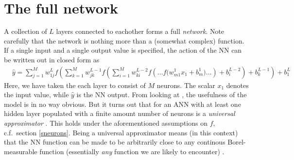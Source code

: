 \documentclass[../../master.tex]{subfiles}
\begin{document}
\begin{SCfigure}
\begin{centering}
\end{centering}
\caption{Schematic representation of a single ANN layer. Each neuron of the layer indexed $k$ is connected from behind to all neurons in layer $k-1$. The connection weights can be organized into a matrix, $W^{k-1}$, and the action of layer $k$ can be succinctly stated as $f(W^{k}{\bf p}^{k-1}+{\bf b}^k)$ where element-wise operation is assumed for the activation $f$. \label{fig:layer}}
\end{SCfigure}

\section{The full network}
A collection of $L$ layers connected to eachother forms a full \emph{network}. Note carefully that the network is nothing more than a (somewhat complex) function. If a single input and a single output value is specified, the action of the NN can be written out in closed form as \cite{stende}
\begin{align}
&\hat y\! = \!\left.\!\sum_{j=1}^{M}\! w_{1j}^L f\!\left(\!\sum_{k=1}^{M}\! w_{jk}^{L-1} f\!\left(\!
\sum_{i=1}^Mw_{ki}^{L-2} f\left( \dots \!f\!\Big(\!w_{m1}^1 x_1 \! + \!b_m^1\!\Big)
 \!\dots \!\right)+ b_i^{L-2}\right) \!+ \!b_k^{L-1}\!\right)
 \!+ \!b_1^L\!\right. && \label{eq:nnfull}
\end{align}
Here, we have taken the each layer to consist of $M$ neurons. The scalar $x_1$ denotes the input value, while $\hat y$ is the NN output. From looking at , the usefulness of the model is in no way obvious. But it turns out that for an ANN with at least one hidden layer populated with a finite amount number of neurons is a \emph{universal approximator} \cite{HORNIK1989359}. This holds under the aforementioned assumptions on $f$, c.f.\ section \ref{sneurons}. Being a universal approximator means (in this context) that the NN function can be made to be arbitrarily close to any continous Borel-measurable function (essentially \emph{any} function we are likely to encounter) \cite{mcdonald}. 
\end{document}
